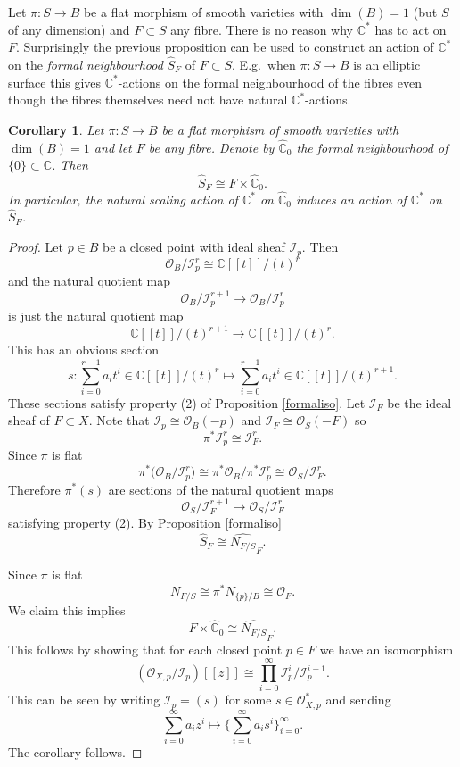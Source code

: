 \documentclass[12pt]{amsart}
\newtheorem{corollary}[theorem]{Corollary}
\theoremstyle{definition}
\theoremstyle{property}
\newcommand\I{\mathcal I}
\renewcommand\O{\mathcal O}
\newcommand\C{\mathbb C}
\renewcommand\_{^{}_}
\begin{document}
Let $\pi : S \rightarrow B$ be a flat morphism of smooth varieties with $\dim(B)=1$ (but $S$ of any dimension) and $F \subset S$ any fibre. There is no reason why $\C^*$ has to act on $F$. Surprisingly the previous proposition can be used to construct an action of $\C^*$ on the \emph{formal neighbourhood} $\widehat{S}_F$ of $F \subset S$. E.g.~when $\pi : S \rightarrow B$ is an elliptic surface this gives $\C^*$-actions on the formal neighbourhood of the fibres even though the fibres themselves need not have natural $\C^*$-actions.
\begin{corollary}
Let $\pi : S \rightarrow B$ be a flat morphism of smooth varieties with $\dim(B)=1$ and let $F$ be any fibre. Denote by $\widehat{\C}_0$ the formal neighbourhood of $\{0\} \subset \C$. Then
$$
\widehat{S}_F \cong F \times \widehat{\C}_0.
$$
In particular, the natural scaling action of $\C^*$ on $\widehat{\C}_0$ induces an action of $\C^*$ on $\widehat{S}_F$.
\end{corollary}
\begin{proof}
Let $p \in B$ be a closed point with ideal sheaf $\I_p$. Then $$\O_B / \I_{p}^{r} \cong \C[\![t]\!] / (t)^r$$ and the natural quotient map
$$
\O_B / \I_{p}^{r+1} \longrightarrow \O_B / \I_{p}^{r}
$$
is just the natural quotient map
$$
\C[\![t]\!] / (t)^{r+1} \longrightarrow \C[\![t]\!] / (t)^r.
$$
This has an obvious section 
$$
s : \sum_{i=0}^{r-1} a_i t^i \in \C[\![t]\!] / (t)^r \mapsto \sum_{i=0}^{r-1} a_i t^i \in \C[\![t]\!] / (t)^{r+1}. 
$$
These sections satisfy property (2) of Proposition \ref{formaliso}. Let $\I_F$ be the ideal sheaf of $F \subset X$. Note that $\I_p \cong \O_B(-p)$ and $\I_F \cong \O_S(-F)$ so
$$
\pi^* \I_{p}^r \cong \I_{F}^{r}.
$$
Since $\pi$ is flat 
$$
\pi^* \big( \O_B / \I_{p}^r \big) \cong \pi^*\O_B / \pi^* \I_{p}^r \cong \O_S / \I_{F}^{r}.
$$
Therefore $\pi^* (s)$ are sections of the natural quotient maps
$$
\O_S / \I_{F}^{r+1} \longrightarrow \O_S / \I_{F}^{r}
$$
satisfying property (2). By Proposition \ref{formaliso}
$$
\widehat{S}_F \cong \widehat{N_{F/S}}_F.
$$

Since $\pi$ is flat 
$$
N_{F/S} \cong \pi^* N_{\{p\}/B} \cong \O_F.
$$
We claim this implies
$$
F \times \widehat{\C}_0 \cong \widehat{N_{F/S}}_F.
$$
This follows by showing that for each closed point $p \in F$ we have an isomorphism 
$$
(\O_{X,p} / \I_{p})[\![z]\!] \cong \prod_{i=0}^{\infty} \I_{p}^{i} / \I_{p}^{i+1}.
$$
This can be seen by writing $\I_p = (s)$ for some $s \in \O_{X,p}^{*}$ and sending
$$
\sum_{i=0}^{\infty} a_i z^i \mapsto \Big\{ \sum_{i=0}^{\infty} a_i s^i \Big\}_{i=0}^{\infty}.
$$
The corollary follows.
\end{proof}
\end{document}
